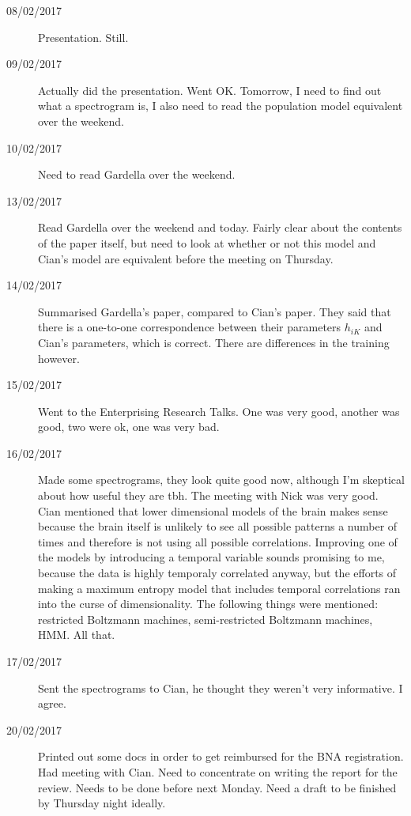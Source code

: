 \documentclass[a4paper,12pt]{article}
\theoremstyle{definition}
\begin{document}
\begin{description}
	\item[08/02/2017] Presentation. Still.

	\item[09/02/2017] Actually did the presentation. Went OK. Tomorrow, I need to find out what a spectrogram is, I also need to read the population model equivalent over the weekend.

	\item[10/02/2017] Need to read Gardella over the weekend.

	\item[13/02/2017] Read Gardella over the weekend and today. Fairly clear about the contents of the paper itself, but need to look at whether or not this model and Cian's model are equivalent before the meeting on Thursday.

	\item[14/02/2017] Summarised Gardella's paper, compared to Cian's paper. They said that there is a one-to-one correspondence between their parameters $h_{iK}$ and Cian's parameters, which is correct. There are differences in the training however.

	\item[15/02/2017] Went to the Enterprising Research Talks. One was very good, another was good, two were ok, one was very bad.

	\item[16/02/2017] Made some spectrograms, they look quite good now, although I'm skeptical about how useful they are tbh. The meeting with Nick was very good. Cian mentioned that lower dimensional models of the brain makes sense because the brain itself is unlikely to see all possible patterns a number of times and therefore is not using all possible correlations. Improving one of the models by introducing a temporal variable sounds promising to me, because the data is highly temporaly correlated anyway, but the efforts of making a maximum entropy model that includes temporal correlations ran into the curse of dimensionality. The following things were mentioned: restricted Boltzmann machines, semi-restricted Boltzmann machines, HMM. All that.

	\item[17/02/2017] Sent the spectrograms to Cian, he thought they weren't very informative. I agree.

	\item[20/02/2017] Printed out some docs in order to get reimbursed for the BNA registration. Had meeting with Cian. Need to concentrate on writing the report for the review. Needs to be done before next Monday. Need a draft to be finished by Thursday night ideally.


\end{description}
\end{document}
